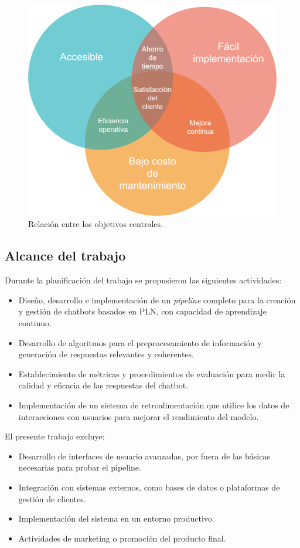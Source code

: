 \begin{figure}[htbp]
  \centering
  \includegraphics[width=.75\textwidth]{./Figures/Venn_objetivos.png}
  \caption{Relación entre los objetivos centrales.}
  \label{fig:objetivos_venn}
\end{figure}

\newpage %
\subsection{Alcance del trabajo}

Durante la planificación del trabajo se propusieron las siguientes actividades:

\begin{itemize}
    \item Diseño, desarrollo e implementación de un \textit{pipeline} completo para la creación y gestión de chatbots basados en PLN, con capacidad de aprendizaje continuo.
    \item Desarrollo de algoritmos para el preprocesamiento de información y generación de respuestas relevantes y coherentes.
    \item Establecimiento de métricas y procedimientos de evaluación para medir la calidad y eficacia de las respuestas del chatbot.
    \item Implementación de un sistema de retroalimentación que utilice los datos de interacciones con usuarios para mejorar el rendimiento del modelo.
\end{itemize}

\vspace{0.5cm} %

El presente trabajo excluye: 
\begin{itemize}
    \item Desarrollo de interfaces de usuario avanzadas, por fuera de las básicas necesarias para probar el pipeline.
    \item Integración con sistemas externos, como bases de datos o plataformas de gestión de clientes.
    \item Implementación del sistema en un entorno productivo.
    \item Actividades de marketing o promoción del producto final.
\end{itemize}


